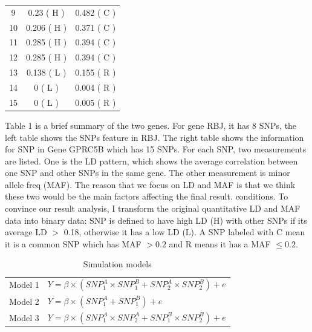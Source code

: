 \documentclass{article}
\begin{document}
\begin{table}[htbp]
{\begin{minipage}[b]{0.4 \textwidth}
\begin{tabular}{c|cc}
                        9	&	0.23	(	H	)&	0.482	(	C	)\\
                        10	&	0.206	(	H	)&	0.371	(	C	)\\
                        11	&	0.285	(	H	)&	0.394	(	C	)\\
                        12	&	0.285	(	H	)&	0.394	(	C	)\\
                        13	&	0.138	(	L	)&	0.155	(	R	)\\
                        14	&	0	(	L	)&	0.004	(	R	)\\
                        15	&	0	(	L	)&	0.005	(	R	)\\
                        \bottomrule
                    \end{tabular}
                \end{minipage}
            }
        \end{table}
        
        Table 1 is a brief summary of the two genes. For gene RBJ, it has 8 SNPs, the left table shows the SNPs feature in RBJ. The right table shows the information for SNP in Gene GPRC5B which has 15 SNPs. For each SNP, two measurements are listed. One is the LD pattern, which shows the average correlation between one SNP and other SNPs in the same gene. The other measurement is minor allele freq (MAF). The reason that we focus on LD and MAF is that we think these two would be the main factors affecting the final result. conditions. To convince our result analysis, I transform the original quantitative LD and MAF data into binary data: SNP is defined to have high LD (H) with other SNPs if its average LD $>$ 0.18, otherwise it has a low LD (L). A SNP labeled with C mean it is a common SNP which has MAF $>0.2$ and R means it has a MAF $\leq 0.2$.

        \begin{table}[htbp]
            \centering
            \caption{Simulation models}
            \begin{tabular}{c|l}
                \toprule
                Model 1 & $Y =\beta\times (SNP^A_1\times SNP^B_1+SNP^A_2\times SNP^B_2)+e$  \\
                Model 2 & $Y =\beta\times (SNP^A_1+SNP^B_1)+e$\\
                Model 3 & $Y =\beta\times (SNP^A_1\times SNP^A_2+SNP^B_1\times SNP^B_2)+e$\\
                \bottomrule
            \end{tabular}            
        \end{table}
\end{document}
